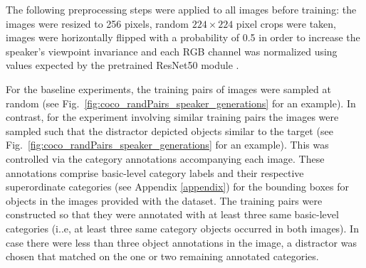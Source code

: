 The following preprocessing steps were applied to all images before training: the images were resized to 256 pixels, random $224\times224$ pixel crops were taken, images were horizontally flipped with a probability of 0.5 in order to increase the speaker's viewpoint invariance and each RGB channel was normalized using values expected by the pretrained ResNet50 module \parencite{he2016deep}.

For the baseline experiments, the training pairs of images were sampled at random (see Fig.~\ref{fig:coco_randPairs_speaker_generations} for an example). In contrast, for the experiment involving similar training pairs the images were sampled such that the distractor depicted objects similar to the target (see Fig.~\ref{fig:coco_randPairs_speaker_generations} for an example). This was controlled via the category annotations accompanying each image. These annotations comprise basic-level category labels and their respective superordinate categories (see Appendix \ref{appendix}) for the bounding boxes for objects in the images provided with the dataset.
The training pairs were constructed so that they were annotated with at least three same basic-level categories (i..e, at least three same category objects occurred in both images). In case there were less than three object annotations in the image, a distractor was chosen that matched on the one or two remaining annotated categories. 

